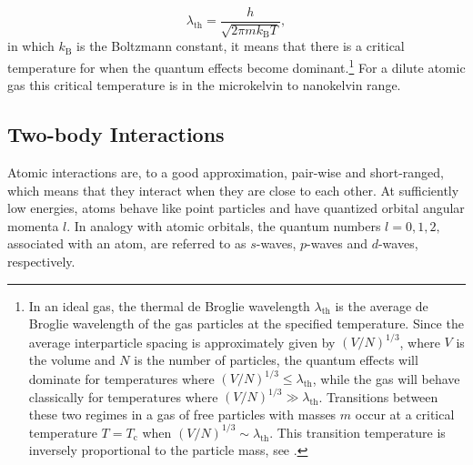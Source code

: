 \begin{equation}
\lambda_{\mathrm{th}} = \frac{h}{\sqrt{2\pi m k_{\mathrm{B}} T}},\label{eq:thermal}
\end{equation}
in which $k_{\mathrm{B}}$ is the Boltzmann constant, it means that there is a critical temperature for when the quantum effects become dominant.\footnote{In an ideal gas, the thermal de Broglie wavelength $\lambda_{\mathrm{th}}$ is the average de Broglie wavelength of the gas particles at the specified temperature. Since the average interparticle spacing is approximately given by $(V/N)^{1/3}$, where $V$ is the volume and $N$ is the number of particles, the quantum effects will dominate for temperatures where $(V/N)^{1/3} \leq \lambda_{\mathrm{th}}$, while the gas will behave classically for temperatures where $(V/N)^{1/3} \gg \lambda_{\mathrm{th}}$. Transitions between these two regimes in a gas of free particles with masses $m$ occur at a critical temperature $T=T_{\mathrm{c}}$ when $(V/N)^{1/3} \sim \lambda_{\mathrm{th}}$. This transition temperature is inversely proportional to the particle mass, see .} For a dilute atomic gas this critical temperature is in the microkelvin to nanokelvin range.

\subsection{Two-body Interactions}
Atomic interactions are, to a good approximation, pair-wise and short-ranged, which means that they interact when they are close to each other. At sufficiently low energies, atoms behave like point particles and have quantized orbital angular momenta $l$. In analogy with atomic orbitals, the quantum numbers $l=0,1,2,$ associated with an atom, are referred to as $s$-waves, $p$-waves and $d$-waves, respectively. 

